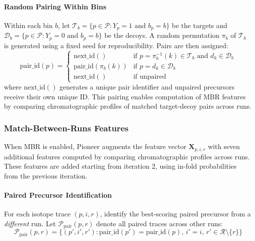 \documentclass[pdflatex,sn-nature]{sn-jnl}
\begin{document}
\paragraph{Random Pairing Within Bins} Within each bin $b$, let $\mathcal{T}_b = \{p \in \mathcal{P} : Y_p = 1 \text{ and } b_p = b\}$ be the targets and $\mathcal{D}_b = \{p \in \mathcal{P} : Y_p = 0 \text{ and } b_p = b\}$ be the decoys. A random permutation $\pi_b$ of $\mathcal{T}_b$ is generated using a fixed seed for reproducibility. Pairs are then assigned:
\begin{equation}
  \text{pair\_id}(p) = \begin{cases}
      \text{next\_id}() & \text{if } p = \pi_b^{-1}(k) \in \mathcal{T}_b \text{ and } d_k \in \mathcal{D}_b \\
      \text{pair\_id}(\pi_b(k)) & \text{if } p = d_k \in \mathcal{D}_b \\
      \text{next\_id}() & \text{if unpaired}
  \end{cases}
\end{equation}
where $\text{next\_id}()$ generates a unique pair identifier and unpaired precursors receive their own unique ID. This pairing enables computation of MBR features by comparing chromatographic profiles of matched target-decoy pairs across runs.

\subsubsection{Match-Between-Runs Features}\label{sec:mbr_features}

When MBR is enabled, Pioneer augments the feature vector $\mathbf{X}_{p,i,r}$ with seven additional features computed by comparing chromatographic profiles across runs. These features are added starting from iteration 2, using in-fold probabilities from the previous iteration.

\paragraph{Paired Precursor Identification} For each isotope trace $(p,i,r)$, identify the best-scoring paired precursor from a \emph{different} run. Let $\mathcal{P}_{\text{pair}}(p, r)$ denote all paired traces across other runs:
\begin{equation}
\mathcal{P}_{\text{pair}}(p, r) = \{(p', i', r') : \text{pair\_id}(p') = \text{pair\_id}(p), \, i' = i, \, r' \in \mathcal{R} \setminus \{r\}\}
\end{equation}
\end{document}
